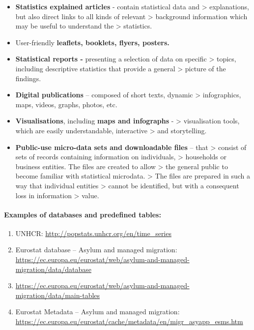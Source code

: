 \documentclass[
]{article}
\begin{document}
\begin{itemize}
\item
  \textbf{Statistics explained articles} - contain statistical data and
  \textgreater{} explanations, but also direct links to all kinds of relevant
  \textgreater{} background information which may be useful to understand the
  \textgreater{} statistics.
\item
  User-friendly \textbf{leaflets, booklets, flyers, posters.}
\item
  \textbf{Statistical reports -} presenting a selection of data on specific
  \textgreater{} topics, including descriptive statistics that provide a general
  \textgreater{} picture of the findings.
\item
  \textbf{Digital publications} -- composed of short texts, dynamic
  \textgreater{} infographics, maps, videos, graphs, photos, etc.
\item
  \textbf{Visualisations}, including \textbf{maps and infographs} -
  \textgreater{} visualisation tools, which are easily understandable, interactive
  \textgreater{} and storytelling.
\item
  \textbf{Public-use micro-data sets and downloadable files} -- that
  \textgreater{} consist of sets of records containing information on individuals,
  \textgreater{} households or business entities. The files are created to allow
  \textgreater{} the general public to become familiar with statistical microdata.
  \textgreater{} The files are prepared in such a way that individual entities
  \textgreater{} cannot be identified, but with a consequent loss in information
  \textgreater{} value.
\end{itemize}

\hypertarget{examples-of-databases-and-predefined-tables}{%
\paragraph{Examples of databases and predefined tables:}\label{examples-of-databases-and-predefined-tables}}

\begin{enumerate}
\def\labelenumi{\roman{enumi}.}
\item
  UNHCR: \url{http://popstats.unhcr.org/en/time_series}
\item
  Eurostat database -- Asylum and managed migration:
  \url{https://ec.europa.eu/eurostat/web/asylum-and-managed-migration/data/database}
\item
  \url{https://ec.europa.eu/eurostat/web/asylum-and-managed-migration/data/main-tables}
\item
  Eurostat Metadata -- Asylum and managed migration:
  \url{https://ec.europa.eu/eurostat/cache/metadata/en/migr_asyapp_esms.htm}
\end{enumerate}
\end{document}
